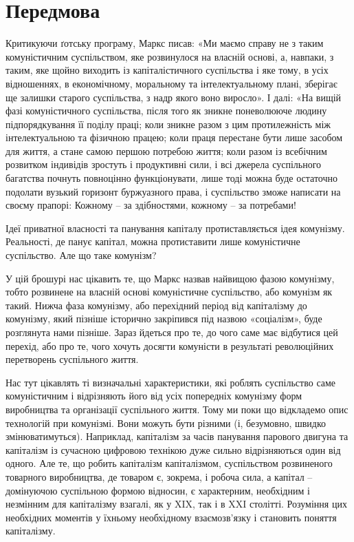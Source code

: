 \documentclass[../main]{subfiles}
\begin{document}
\ifSubfilesClassLoaded{\setcounter{page}{7}}{}
\section{Передмова}
\label{sec:02_predislovie}

Критикуючи ґотську програму, Маркс писав: «Ми маємо справу не з таким комуністичним суспільством, яке розвинулося на власній основі, а, навпаки, з таким, яке щойно виходить із капіталістичного суспільства і яке тому, в усіх відношеннях, в економічному, моральному та інтелектуальному плані, зберігає ще залишки старого суспільства, з надр якого воно виросло». І далі: «На вищій фазі комуністичного суспільства, після того як зникне поневолююче людину підпорядкування її поділу праці; коли зникне разом з цим протилежність між інтелектуальною та фізичною працею; коли праця перестане бути лише засобом для життя, а стане самою першою потребою життя; коли разом із всебічним розвитком індивідів зростуть і продуктивні сили, і всі джерела суспільного багатства почнуть повноцінно функціонувати, лише тоді можна буде остаточно подолати вузький горизонт буржуазного права, і суспільство зможе написати на своєму прапорі: Кожному – за здібностями, кожному – за потребами!

Ідеї приватної власності та панування капіталу протиставляється ідея комунізму. Реальності, де панує капітал, можна протиставити лише комуністичне суспільство. Але що таке комунізм?

У цій брошурі нас цікавить те, що Маркс назвав найвищою фазою комунізму, тобто розвинене на власній основі комуністичне суспільство, або комунізм як такий. Нижча фаза комунізму, або перехідний період від капіталізму до комунізму, який пізніше історично закріпився під назвою «соціалізм», буде розглянута нами пізніше. Зараз йдеться про те, до чого саме має відбутися цей перехід, або про те, чого хочуть досягти комуністи в результаті революційних перетворень суспільного життя.

Нас тут цікавлять ті визначальні характеристики, які роблять суспільство саме комуністичним і відрізняють його від усіх попередніх комунізму форм виробництва та організації суспільного життя. Тому ми поки що відкладемо опис технологій при комунізмі. Вони можуть бути різними (і, безумовно, швидко змінюватимуться). Наприклад, капіталізм за часів панування парового двигуна та капіталізм із сучасною цифровою технікою дуже сильно відрізняються один від одного. Але те, що робить капіталізм капіталізмом, суспільством розвиненого товарного виробництва, де товаром є, зокрема, і робоча сила, а капітал – домінуючою суспільною формою відносин, є характерним, необхідним і незмінним для капіталізму взагалі, як у XIX, так і в XXI столітті. Розуміння цих необхідних моментів у їхньому необхідному взаємозв’язку і становить поняття капіталізму.
\end{document}
